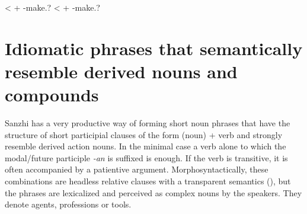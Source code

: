 \begin{exe}
	\ex	\label{ex:CompoundNounsNumerals2} 
	\begin{xlist}
		\TabPositions{9em,11em}					
			\ex	{}			\tab	<	\tab	 {}  +  -make.? 
			\ex	{}				\tab	<	\tab	 {}  +  -make.? 
	\end{xlist}
\end{exe}	



\section{Idiomatic phrases that semantically resemble derived nouns and compounds}
\label{ssec:N-genN}
Sanzhi has a very productive way of forming short noun phrases that have the structure of short participial clauses of the form (noun) + verb and strongly resemble derived action nouns. In the minimal case a verb alone to which the modal/future participle \textit{-an} is suffixed is enough. If the verb is transitive, it is often accompanied by a patientive argument. Morphosyntactically, these combinations are headless relative clauses with a transparent semantics (), but the phrases are lexicalized and perceived as complex nouns by the speakers. They denote agents, professions or tools.

